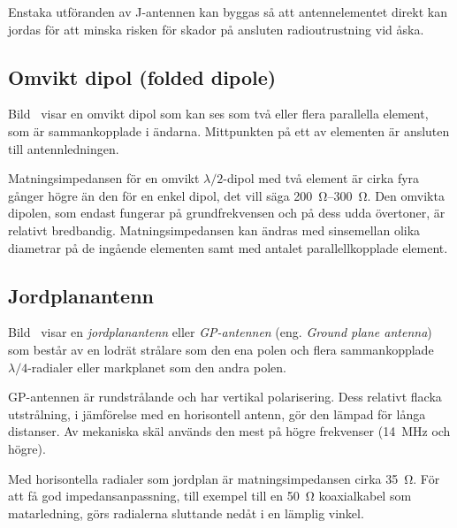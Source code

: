 Enstaka utföranden av J-antennen kan byggas så att antennelementet direkt kan
jordas för att minska risken för skador på ansluten radioutrustning vid åska.


\subsection{Omvikt dipol (folded dipole)}

Bild~ visar en omvikt dipol som kan ses som två eller
flera parallella element, som är sammankopplade i ändarna.
Mittpunkten på ett av elementen är ansluten till antennledningen.

Matningsimpedansen för en omvikt \(\lambda/2\)-dipol med två element är
cirka fyra gånger högre än den för en enkel dipol, det vill säga
\SIrange{200}{300}{\ohm}.
Den omvikta dipolen, som endast fungerar på grundfrekvensen och på
dess udda övertoner, är relativt bredbandig.
Matningsimpedansen kan ändras med sinsemellan olika diametrar på de ingående
elementen samt med antalet parallellkopplade element.


\subsection{Jordplanantenn}
\label{jordplanantenn}

Bild~ visar en \emph{jordplanantenn} eller
\emph{GP-antennen} (eng. \emph{Ground plane antenna}) som består av en
lodrät strålare som den ena polen och flera sammankopplade
\(\lambda/4\)-radialer eller markplanet som den andra polen.

GP-antennen är rundstrålande och har vertikal polarisering.
Dess relativt flacka utstrålning, i jämförelse med en horisontell antenn,
gör den lämpad för långa distanser.
Av mekaniska skäl används den mest på högre frekvenser (\qty{14}{\mega\hertz}
och högre).

Med horisontella radialer som jordplan är matningsimpedansen cirka
\qty{35}{\ohm}.
För att få god impedansanpassning, till exempel till en \qty{50}{\ohm}
koaxialkabel som matarledning, görs radialerna sluttande nedåt i en lämplig
vinkel.


